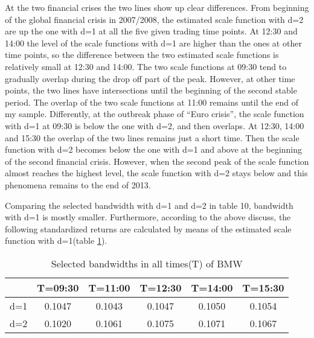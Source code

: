 At the two financial crises the two lines show up clear differences. From beginning of the global financial crisis in 2007/2008, the estimated scale function with d=2 are up the one with d=1 at all the five given trading time points. At 12:30 and 14:00 the level of the scale functions with d=1 are higher than the ones at other time points, so the difference between the two estimated scale functions is relatively small at 12:30 and 14:00. The two scale functions at 09:30 tend to gradually overlap during the drop off part of the peak. However, at other time points, the two lines have intersections until the beginning of the second stable period. The overlap of the two scale functions at 11:00 remains until the end of my sample. Differently, at the outbreak phase of ``Euro crisis'', the scale function with d=1 at 09:30 is below the one with d=2, and then overlaps. At 12:30, 14:00 and 15:30 the overlap of the two lines remains just a short time. Then the scale function with d=2 becomes below the one with d=1 and above at the beginning of the second financial crisis. However, when the second peak of the scale function almost reaches the highest level, the scale function with d=2 stays below and this phenomena remains to the end of 2013.

Comparing the selected bandwidth with d=1 and d=2 in table 10, bandwidth with d=1 is mostly smaller. Furthermore, according to the above discuss, the following standardized returns are calculated by means of the estimated scale function with d=1(table \ref{tab:bandwidthBMW}).

\begin{table}[!h]
 \small
 \centering
 \vspace{2ex} 
\begin{tabular}{c|c|c|c|c|c}
\toprule
    &T=09:30&T=11:00&T=12:30&T=14:00&T=15:30 \\
\midrule
\hline
d=1	& 0.1047	& 0.1043	& 0.1047	& 0.1050	& 0.1054	\\
d=2	& 0.1020	& 0.1061	& 0.1075	& 0.1071	& 0.1067	\\
\bottomrule

\end{tabular}
  \caption{Selected bandwidths in all times(T) of BMW}
  \label{tab:bandwidthBMW}
\end{table}

